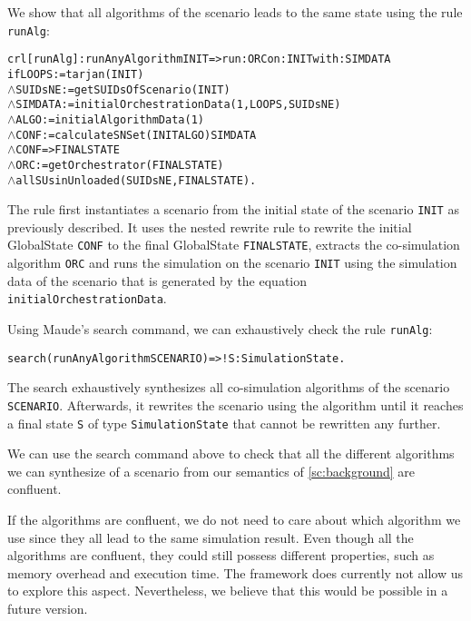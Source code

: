 We show that all algorithms of the scenario leads to the same state using the rule \texttt{runAlg}:
\small
\begin{alltt}
crl [runAlg] : runAnyAlgorithm INIT => run: ORC on: INIT with: SIMDATA
  if LOOPS := tarjan(INIT)
  \(\land\) SUIDsNE := getSUIDsOfScenario(INIT)
  \(\land\) SIMDATA := initialOrchestrationData(1,LOOPS,SUIDsNE)
  \(\land\) ALGO := initialAlgorithmData(1)
  \(\land\) CONF := calculateSNSet(INIT ALGO) SIMDATA 
  \(\land\) {CONF} => { FINALSTATE } 
  \(\land\) ORC := getOrchestrator(FINALSTATE)
  \(\land\) allSUsinUnloaded(SUIDsNE, FINALSTATE) .
\end{alltt}
\normalsize
The rule first instantiates a scenario from the initial state of the scenario \texttt{INIT} as previously described.
It uses the nested rewrite rule to rewrite the initial GlobalState \texttt{CONF} to the final GlobalState \texttt{FINALSTATE}, extracts the co-simulation algorithm \texttt{ORC} and runs the simulation on the scenario \texttt{INIT} using the simulation data of the scenario that is generated by the equation \texttt{initialOrchestrationData}.

Using Maude's search command, we can exhaustively check the rule \texttt{runAlg}:
\small
\begin{alltt}
  search (runAnyAlgorithm SCENARIO)  =>! S:SimulationState . 
\end{alltt}
\normalsize

The search exhaustively synthesizes all co-simulation algorithms of the scenario \texttt{SCENARIO}. 
Afterwards, it rewrites the scenario using the algorithm until it reaches a final state \texttt{S} of type \texttt{SimulationState} that cannot be rewritten any further.

We can use the search command above to check that all the different algorithms we can synthesize of a scenario from our semantics of \cref{sc:background} are confluent.


If the algorithms are confluent, we do not need to care about which algorithm we use since they all lead to the same simulation result.
Even though all the algorithms are confluent, they could still possess different properties, such as memory overhead and execution time. 
The framework does currently not allow us to explore this aspect.
Nevertheless, we believe that this would be possible in a future version.